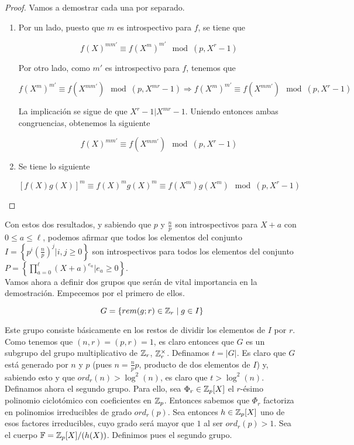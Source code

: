 \begin{proof}
	Vamos a demostrar cada una por separado.
	
	\begin{enumerate}
		\item Por un lado, puesto que $m$ es introspectivo para $f$, se tiene que
		
		\[ f(X)^{mm'} \equiv f(X^m)^{m'} \mod(p, X^r - 1) \]
		
		Por otro lado, como $m'$ es introspectivo para $f$, tenemos que
		
		\[ f(X^m)^{m'} \equiv f(X^{mm'}) \mod(p, X^{mr} - 1) \Rightarrow f(X^m)^{m'} \equiv f(X^{mm'}) \mod(p, X^r - 1) \]
		
		La implicación se sigue de que $X^r - 1 | X^{mr} - 1$. Uniendo entonces ambas congruencias, obtenemos la siguiente
		
		\[ f(X)^{mm'} \equiv f(X^{mm'}) \mod(p, X^r - 1) \]
		
		\item Se tiene lo siguiente
		
		\[ \left[f(X)g(X)\right]^m \equiv f(X)^mg(X)^m \equiv f(X^m)g(X^m) \mod(p, X^r - 1) \]
	\end{enumerate}
\end{proof}

Con estos dos resultados, y sabiendo que $p$ y $\frac{n}{p}$ son introspectivos para $X + a$ con $0 \leq a \leq \ell$, podemos afirmar que todos los elementos del conjunto $I = \left\{ p^i\left(\frac{n}{p}\right)^j | i, j \geq 0 \right\}$ son introspectivos para todos los elementos del conjunto $P = \left\{ \prod_{a=0}^{\ell}(X + a)^{e_a} | e_a \geq 0 \right\}$.\\

Vamos ahora a definir dos grupos que serán de vital importancia en la demostración. Empecemos por el primero de ellos.

\[ G = \left\{ rem(g; r) \in \mathbb{Z}_r \mid g \in I \right\} \]

Este grupo consiste básicamente en los restos de dividir los elementos de $I$ por $r$. Como tenemos que $(n, r) = (p, r) = 1$, es claro entonces que $G$ es un subgrupo del grupo multiplicativo de $\mathbb{Z}_r$, $\mathbb{Z}_r^\times$. Definamos $t = |G|$. Es claro que $G$ está generado por $n$ y $p$ (pues $n = \frac{n}{p}p$, producto de dos elementos de $I$) y, sabiendo esto y que $ord_r(n) > \log^2(n)$, es claro que $t > \log^2(n)$.\\

Definamos ahora el segundo grupo. Para ello, sea $\Phi_r \in \mathbb{Z}_p[X]$ el $r$-ésimo polinomio ciclotómico con coeficientes en $\mathbb{Z}_p$. Entonces sabemos que $\Phi_r$ factoriza en polinomios irreducibles de grado $ord_r(p)$. Sea entonces $h \in \mathbb{Z}_p[X]$ uno de esos factores irreducibles, cuyo grado será mayor que $1$ al ser $ord_r(p) > 1$. Sea el cuerpo $\mathbb{F} = \mathbb{Z}_p[X]/(h(X))$. Definimos pues el segundo grupo.

